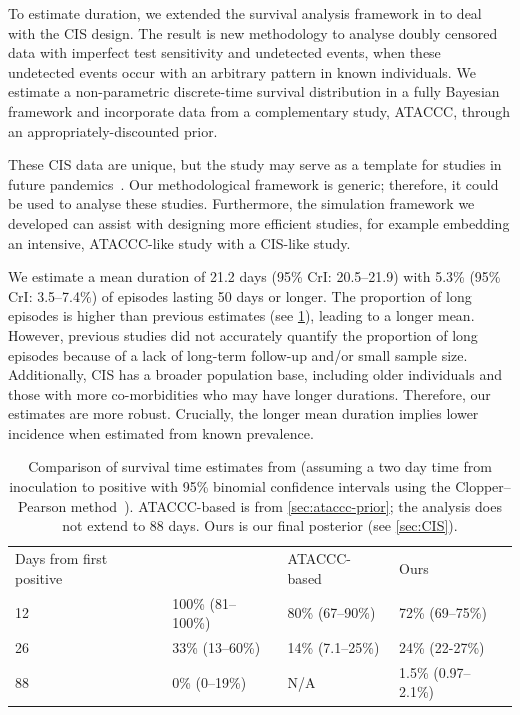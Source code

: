 \documentclass[12pt]{article}
\begin{document}
To estimate duration, we extended the survival analysis framework in \citet{heiseyModelling} to deal with the CIS design. The result is new methodology to analyse doubly censored data with imperfect test sensitivity and undetected events, when these undetected events occur with an arbitrary pattern in known individuals.
We estimate a non-parametric discrete-time survival distribution in a fully Bayesian framework and incorporate data from a complementary study, ATACCC, through an appropriately-discounted prior.

These CIS data are unique, but the study may serve as a template for studies in future pandemics~\citep{hallettModule}.
Our methodological framework is generic; therefore, it could be used to analyse these studies.
Furthermore, the simulation framework we developed can assist with designing more efficient studies, for example embedding an intensive, ATACCC-like study with a CIS-like study.

We estimate a mean duration of 21.2 days (95\% CrI: 20.5--21.9) with 5.3\% (95\% CrI: 3.5--7.4\%) of episodes lasting 50 days or longer.
The proportion of long episodes is higher than previous estimates (see \cref{tab:compare-survival}), leading to a longer mean.
However, previous studies did not accurately quantify the proportion of long episodes because of a lack of long-term follow-up and/or small sample size.
Additionally, CIS has a broader population base, including older individuals and those with more co-morbidities who may have longer durations.
Therefore, our estimates are more robust.
Crucially, the longer mean duration implies lower incidence when estimated from known prevalence.

\begin{table}[]
\centering
\begin{tabular}{llll}
Days from first positive & \citet{killingleySafety}  & ATACCC-based     & Ours                \\
12                       & 100\% (81--100\%) & 80\% (67--90\%)  & 72\% (69--75\%)     \\
26                       & 33\% (13--60\%)   & 14\% (7.1--25\%) & 24\% (22-27\%)      \\
88                       & 0\% (0--19\%)     & N/A              & 1.5\% (0.97--2.1\%)
\end{tabular}
\caption{
    Comparison of survival time estimates from
     (assuming a two day time from inoculation to positive with 95\% binomial confidence intervals using the Clopper--Pearson method~\citep{clopperUse}).
    ATACCC-based is from \cref{sec:ataccc-prior}; the analysis does not extend to 88 days.
    Ours is our final posterior (see \cref{sec:CIS}).
}
\label{tab:compare-survival}
\end{table}
\end{document}

